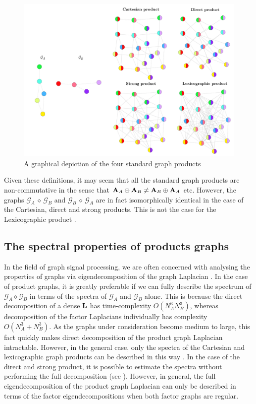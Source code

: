 \begin{figure}[t]
    \begin{center}
        \includegraphics[width=0.95\linewidth]{Figures/product_graphs.pdf}
    \end{center}
    \caption[Graphical depiction of the standard graph products]{A graphical depiction of the four standard graph products}
    \label{fig:graph_products}
\end{figure}

Given these definitions, it may seem that all the standard graph products are non-commutative in the sense that $\mathbf{A}_A \oplus \mathbf{A}_B  \neq \mathbf{A}_B \oplus \mathbf{A}_A $ etc. However, the graphs $\mathcal{G}_A \, \diamond \, \mathcal{G}_B$ and $\mathcal{G}_B \, \diamond \, \mathcal{G}_A$ are in fact isomorphically identical in the case of the Cartesian, direct and strong products. This is not the case for the Lexicographic product \citep{Imrich2000}.

\subsection{The spectral properties of products graphs}

In the field of graph signal processing, we are often concerned with analysing the properties of graphs via eigendecomposition of the graph Laplacian \citep{Mieghem2010}. In the case of product graphs, it is greatly preferable if we can fully describe the spectrum of $\mathcal{G}_A \diamond \mathcal{G}_B$ in terms of the spectra of $\mathcal{G}_A$ and $\mathcal{G}_B$ alone. This is because the direct decomposition of a dense $\mathbf{L}$ has time-complexity $O(N_A^3N_B^3)$, whereas decomposition of the factor Laplacians individually has complexity $O(N_A^3 + N_B^3)$. As the graphs under consideration become medium to large, this fact quickly makes direct decomposition of the product graph Laplacian intractable. However, in the general case, only the spectra of the Cartesian and lexicographic graph products can be described in this way \citep{Barik2018}. In the case of the direct and strong product, it is possible to estimate the spectra without performing the full decomposition (see \citep{Sayama2016}). However, in general, the full eigendecomposition of the product graph Laplacian can only be described in terms of the factor eigendecompositions when both factor graphs are regular.


